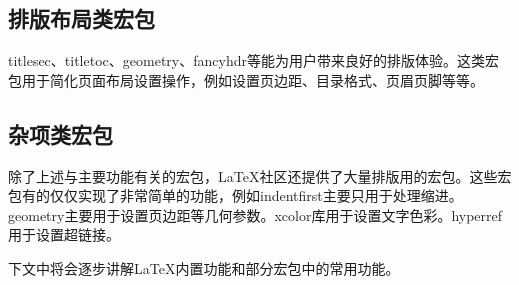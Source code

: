 \subsection{排版布局类宏包}

titlesec、titletoc、geometry、fancyhdr等能为用户带来良好的排版体验。这类宏包用于简化页面布局设置操作，例如设置页边距、目录格式、页眉页脚等等。

\subsection{杂项类宏包}

除了上述与主要功能有关的宏包，\LaTeX 社区还提供了大量排版用的宏包。这些宏包有的仅仅实现了非常简单的功能，例如indentfirst主要只用于处理缩进。geometry主要用于设置页边距等几何参数。xcolor库用于设置文字色彩。hyperref用于设置超链接。

下文中将会逐步讲解\LaTeX 内置功能和部分宏包中的常用功能。

